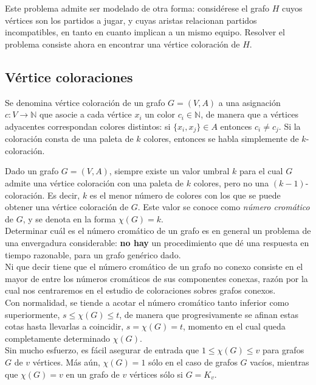 Este problema admite ser modelado de otra forma: considérese el grafo $H$ cuyos vértices son los partidos a jugar, y cuyas aristas relacionan partidos incompatibles, en tanto en cuanto implican a un mismo equipo. Resolver el problema consiste ahora en encontrar una vértice coloración de $H$.\\

\subsection{Vértice coloraciones}

\begin{fondo}
Se denomina vértice coloración de un grafo $G = (V,A)$ a una asignación $c: V \rightarrow \mathbb{N}$ que asocie a cada vértice $x_i$ un color $c_i \in \mathbb{N}$, de manera que a vértices adyacentes correspondan colores distintos: si $\{x_i,x_j\} \in A$ entonces $c_i \ne c_j$. Si la coloración consta de una paleta de $k$ colores, entonces se habla simplemente de $k$-coloración.
\end{fondo}

Dado un grafo $G = (V,A)$, siempre existe un valor umbral $k$ para el cual $G$ admite una vértice coloración con una paleta de $k$ colores, pero no una $(k-1)$-coloración. Es decir, $k$ es el menor número de colores con los que se puede obtener una vértice coloración de $G$. Este valor se conoce como \emph{número cromático} de $G$, y se denota en la forma $\chi (G) = k$.\\

Determinar cuál es el número cromático de un grafo es en general un problema de una envergadura considerable: \textbf{no hay} un procedimiento que dé una respuesta en tiempo razonable, para un grafo genérico dado.\\

Ni que decir tiene que el número cromático de un grafo no conexo consiste en el mayor de entre los números cromáticos de sus componentes conexas, razón por la cual nos centraremos en el estudio de coloraciones sobres grafos conexos.\\

Con normalidad, se tiende a acotar el número cromático tanto inferior como superiormente, $s \leq \chi (G) \leq t$, de manera que progresivamente se afinan estas cotas hasta llevarlas a coincidir, $s = \chi (G) = t$, momento en el cual queda completamente determinado $\chi (G)$.\\

Sin mucho esfuerzo, es fácil asegurar de entrada que $1 \leq \chi (G) \leq v$ para grafos $G$ de $v$ vértices. Más aún, $\chi (G) = 1$ sólo en el caso de grafos $G$ vacíos, mientras que $\chi (G) = v$ en un grafo de $v$ vértices sólo si $G = K_v$.\\

